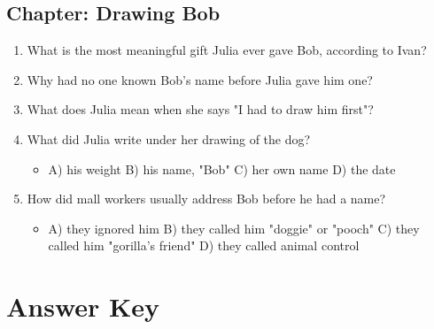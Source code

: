 \documentclass[11pt]{article}
\begin{document}
\subsection*{Chapter: Drawing Bob}
\begin{enumerate}
  \item What is the most meaningful gift Julia ever gave Bob, according to Ivan?
  \vspace{0.5in}
  \item Why had no one known Bob's name before Julia gave him one?
  \vspace{0.5in}
  \item What does Julia mean when she says "I had to draw him first"?
  \vspace{0.5in}
  \item What did Julia write under her drawing of the dog?
  \begin{itemize}\setlength\itemsep{0pt}
    \item[] A) his weight \quad B) his name, "Bob" \quad C) her own name \quad D) the date
  \end{itemize}
  \item How did mall workers usually address Bob before he had a name?
  \begin{itemize}\setlength\itemsep{0pt}
    \item[] A) they ignored him \quad B) they called him "doggie" or "pooch" \quad C) they called him "gorilla's friend" \quad D) they called animal control
  \end{itemize}
\end{enumerate}

\newpage
\section*{Answer Key}
\end{document}
